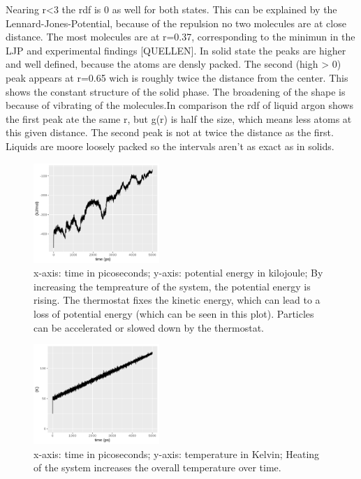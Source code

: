 \documentclass[10pt, a4paper, oneside, twocolumn]{article}
\begin{document}
Nearing r<3 the rdf is 0 as well for both states. This can be explained by the Lennard-Jones-Potential, because of the repulsion no two molecules are at close distance. The most molecules are at r=0.37, corresponding to the minimun in the LJP and experimental findings [QUELLEN].
In solid state the peaks are higher and well defined, because the atoms are densly packed. The second (high > 0) peak appears at r=0.65 wich is roughly twice the distance from the center. This shows the constant structure of the solid phase. The broadening of the shape is because of vibrating of the molecules.In comparison the rdf of liquid argon shows the first peak ate the same r, but g(r) is half the size, which means less atoms at this given distance. The second peak is not at twice the distance as the first. Liquids are moore loosely packed so the intervals aren't as exact as in solids.


\begin{figure}[t]
    \centering
    \includegraphics[width=180px]{plots/Heatup/pot_energy_heatup.png}
    \caption{x-axis: time in picoseconds; y-axis: potential energy in kilojoule; By increasing the tempreature of the system, the potential energy is rising. The thermostat fixes the kinetic energy, which can lead to a loss of potential energy (which can be seen in this plot). Particles can be accelerated or slowed down by the thermostat.}
    \label{heatup_potentialenergy}
\end{figure}

\begin{figure}[t]
    \centering
    \includegraphics[width=180px]{plots/Heatup/temp_heatup.png}
    \caption{x-axis: time in picoseconds; y-axis: temperature in Kelvin; Heating of the system increases the overall temperature over time.}
    \label{heatup_tempreature}
\end{figure}
\end{document}
